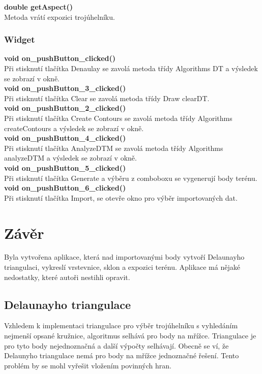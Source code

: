\documentclass[a4paper, 12pt]{article}
\begin{document}
\textbf{double getAspect()}\\
Metoda vrátí expozici trojúhelníku.\\

\subsubsection{Widget}

\textbf{void on\_pushButton\_clicked()}\\
Při stisknutí tlačítka Denaulay se zavolá metoda třídy Algorithms DT a výsledek se zobrazí v okně.
\\

\textbf{void on\_pushButton\_3\_clicked()}\\
Při stisknutí tlačítka Clear se zavolá metoda třídy Draw clearDT.
\\

\textbf{void on\_pushButton\_2\_clicked()}\\
Při stisknutí tlačítka Create Contours se zavolá metoda třídy Algorithms createContours a výsledek se zobrazí v okně.
\\

\textbf{void on\_pushButton\_4\_clicked()}\\
Při stisknutí tlačítka AnalyzeDTM se zavolá metoda třídy Algorithms analyzeDTM a výsledek se zobrazí v okně.
\\

\textbf{void on\_pushButton\_5\_clicked()}\\
Při stisknutí tlačítka Generate a výběru z comboboxu se vygenerují body terénu.
\\

\textbf{void on\_pushButton\_6\_clicked()}\\
Při stisknutí tlačítka Import, se otevře okno pro výběr importovaných dat.
\\



\clearpage
\section{Závěr}
Byla vytvořena aplikace, která nad importovanými body vytvoří Delaunayho triangulaci, vykreslí vrstevnice, sklon a expozici terénu. Aplikace má nějaké nedostatky, které autoři nestihli opravit.\\

\subsection{Delaunayho triangulace}
Vzhledem k implementaci triangulace pro výběr trojúhelníku s vyhledáním nejmenší opsané kružnice, algoritmus selhává pro body na mřížce. Triangulace je pro tyto body nejednoznačná a další výpočty selhávají. Obecně se ví, že Delaunyho triangulace nemá pro body na mřížce jednoznačné řešení. Tento problém by se mohl vyřešit vložením povinných hran.\\
\end{document}
